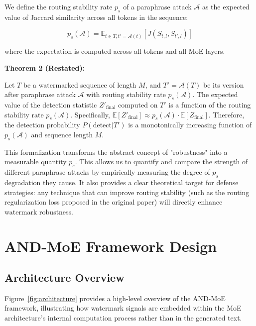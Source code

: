 \documentclass[letterpaper,twocolumn,10pt]{article}
\begin{document}
We define the routing stability rate $p_s$ of a paraphrase attack $\mathcal{A}$ as the expected value of Jaccard similarity across all tokens in the sequence:

\begin{equation}
p_s(\mathcal{A}) = \mathbb{E}_{t \in T, t'=\mathcal{A}(t)} [J(S_{t,l}, S_{t',l})]
\end{equation}

where the expectation is computed across all tokens and all MoE layers.

\textbf{Theorem 2 (Restated):}

Let $T$ be a watermarked sequence of length $M$, and $T' = \mathcal{A}(T)$ be its version after paraphrase attack $\mathcal{A}$ with routing stability rate $p_s(\mathcal{A})$. The expected value of the detection statistic $Z'_{\text{final}}$ computed on $T'$ is a function of the routing stability rate $p_s(\mathcal{A})$. Specifically, $\mathbb{E}[Z'_{\text{final}}] \approx p_s(\mathcal{A}) \cdot \mathbb{E}[Z_{\text{final}}]$. Therefore, the detection probability $P(\text{detect}|T')$ is a monotonically increasing function of $p_s(\mathcal{A})$ and sequence length $M$.

This formalization transforms the abstract concept of "robustness" into a measurable quantity $p_s$. This allows us to quantify and compare the strength of different paraphrase attacks by empirically measuring the degree of $p_s$ degradation they cause. It also provides a clear theoretical target for defense strategies: any technique that can improve routing stability (such as the routing regularization loss proposed in the original paper) will directly enhance watermark robustness.

\section{AND-MoE Framework Design}

\subsection{Architecture Overview}

Figure~\ref{fig:architecture} provides a high-level overview of the AND-MoE framework, illustrating how watermark signals are embedded within the MoE architecture's internal computation process rather than in the generated text.
\end{document}
